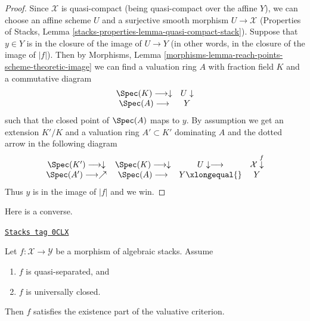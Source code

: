 \begin{proof}
\medskip\noindent
Since $\mathcal{X}$ is quasi-compact (being quasi-compact over the
affine $Y$), we can choose an affine scheme $U$ and a surjective
smooth morphism $U \to \mathcal{X}$
(Properties of Stacks, Lemma
\ref{stacks-properties-lemma-quasi-compact-stack}).
Suppose that $y \in Y$ is in the closure of the image of $U \to Y$
(in other words, in the closure of the image of $|f|$).
Then by
Morphisms, Lemma \ref{morphisms-lemma-reach-points-scheme-theoretic-image}
we can find a valuation ring $A$ with fraction field $K$
and a commutative diagram
$$
\begin{array}{cc}\Spec(K) \longrightarrow\downarrow & U \downarrow \\ \Spec(A) \longrightarrow & Y\end{array}
$$
such that the closed point of $\Spec(A)$ maps to $y$. By assumption
we get an extension $K'/K$ and a valuation ring $A' \subset K'$
dominating $A$ and the dotted arrow in the following diagram
$$
\begin{array}{cccc}\Spec(K') \longrightarrow\downarrow & \Spec(K) \longrightarrow\downarrow & U \downarrow\longrightarrow & \mathcal{X} \overset{f}{\downarrow} \\ \Spec(A') \longrightarrow\nearrow & \Spec(A) \longrightarrow & Y  \xlongequal{} & Y\end{array}
$$
Thus $y$ is in the image of $|f|$ and we win.
\end{proof}

Here is a converse.

\begin{lemma}
\label{stacks-morphisms-lemma-converse-existence-universally-closed}
\href{https://stacks.math.columbia.edu/tag/0CLX}{\texttt{Stacks tag 0CLX}}

Let $f : \mathcal{X} \to \mathcal{Y}$ be a morphism of algebraic stacks.
Assume
\begin{enumerate}
\item $f$ is quasi-separated, and
\item $f$ is universally closed.
\end{enumerate}
Then $f$ satisfies the existence part of the valuative criterion.
\end{lemma}


